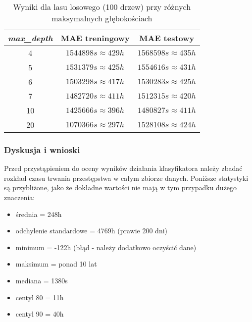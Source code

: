 \documentclass{classrep}
\begin{document}
{{{                \begin{table}
                    \centering
                    \begin{tabular}{|c|c|c|}
                        \hline
                        \emph{max\_depth} & MAE treningowy & MAE testowy \\ \hline
                        4 & $1544898s \approx 429h$ & $1568598s \approx 435h$ \\
                        5 & $1531379s \approx 425h$ & $1554616s \approx 431h$ \\
                        6 & $1503298s \approx 417h$ & $1530283s \approx 425h$ \\
                        7 & $1482720s \approx 411h$ & $1512315s \approx 420h$ \\
                        10 & $1425666s \approx 396h$ & $1480827s \approx 411h$ \\
                        20 & $1070366s \approx 297h$ & $1528108s \approx 424h$ \\ \hline
                    \end{tabular}
                    \caption{Wyniki dla lasu losowego (100 drzew) przy różnych maksymalnych głębokościach}
                    \label{tab:tr_rf_max_depth}
                \end{table}
            }

            \subsubsection{Dyskusja i wnioski} {
                Przed przystąpieniem do oceny wyników działania klasyfikatora należy zbadać rozkład czasu trwania
                przestępstwa w całym zbiorze danych. Poniższe statystyki są przybliżone, jako że dokładne wartości
                nie mają w tym przypadku dużego znaczenia:

                \begin{itemize}
                    \item średnia = 248h
                    \item odchylenie standardowe = 4769h (prawie 200 dni)
                    \item minimum = -122h (błąd - należy dodatkowo oczyścić dane)
                    \item maksimum = ponad 10 lat
                    \item mediana = 1380s
                    \item centyl 80 = 11h
                    \item centyl 90 = 40h
                \end{itemize}

}}}
\end{document}
